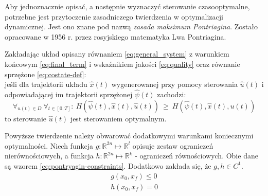 Aby jednoznacznie opisać, a następnie wyznaczyć sterowanie czasooptymalne, potrzebne jest przytoczenie zasadniczego twierdzenia w optymalizacji dynamicznej. Jest ono znane pod nazwą \emph{zasada maksimum Pontriagina}. Zostało opracowane w 1956 r. przez rosyjskiego matematyka Lwa Pontriagina.

\begin{pontriagin-max}\label{the:pontryagin}
    Zakładając układ opisany równaniem \ref{eq:general_system} z warunkiem końcowym \ref{eq:final_term} i wskaźnikiem jakości \ref{eq:quality} oraz równanie sprzężone \ref{eq:costate-def}:\\
    jeśli dla trajektorii układu $\hat{x}(t)$ wygenerowanej przy pomocy sterowania $\hat{u}(t)$ i odpowiadającej im trajektorii sprzężonej $\hat{\psi}(t)$ zachodzi:\\
    \begin{equation}\label{eq:pontriagin}
    \forall_{u(t) \in D}~ \forall_{t \in [0, T]}:~ H(\hat{\psi}(t), \hat{x}(t), \hat{u}(t)) ~ \geq ~ H(\hat{\psi}(t), \hat{x}(t), u(t))
    \end{equation}
    to sterowanie $\hat{u}(t)$ jest sterowaniem optymalnym.
\end{pontriagin-max}

Powyższe twierdzenie należy obwarować dodatkowymi warunkami koniecznymi optymalności. Niech funkcja $g: \mathbb{R}^{2n} \longmapsto \mathbb{R}^{l}$ opisuje zestaw ograniczeń nierównościowych, a funkcja $h: \mathbb{R}^{2n} \longmapsto \mathbb{R}^{k}$ - ograniczeń równościowych. Obie dane są wzorem \ref{eq:pontryagin-constraints}. Dodatkowo zakłada się, że $g, h \in C^{1}$.
\begin{equation}\label{eq:pontryagin-constraints}
    \begin{array}{lr}
    g(x_{0}, x_{f}) \leq 0 \\
    h(x_{0}, x_{f}) = 0
    \end{array}
\end{equation}

